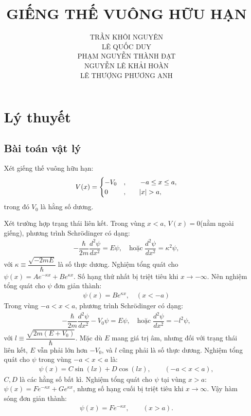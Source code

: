 \documentclass{article}
\title{\Huge{GIẾNG THẾ VUÔNG HỮU HẠN}}
\begin{document}
	\setlength{\parindent}{20pt}
	\newpage
	\author{TRẦN KHÔI NGUYÊN \\LÊ QUỐC DUY \\ PHẠM NGUYỄN THÀNH ĐẠT \\NGUYỄN LÊ KHẢI HOÀN \\ LÊ THƯỢNG PHƯƠNG ANH}
	\maketitle
	
	\newpage
	\tableofcontents
	\newpage
	\section{Lý thuyết}
	\subsection{Bài toán vật lý}
	Xét giếng thế vuông hữu hạn:
	\begin{align}
		V(x) = 
		\begin{cases}
			-V_0 &, \quad \quad -a  \leq x \leq a ,\\ 
			0    &, \quad \quad \abs{x} > a,
		\end{cases}
	\end{align}
	trong đó $V_0$ là hằng số dương.
	
	
	
	Xét trường hợp trạng thái liên kết. Trong vùng $x<a$, $V(x) = 0$(nằm ngoài giếng), phương trình Schr\"{o}dinger có dạng:
	\begin{align}
		-\dfrac{\hbar}{2m}\dfrac{d^2\psi}{dx^2} = E \psi, \quad \text{hoặc} \; \dfrac{d^2\psi}{dx^2} = \kappa^2 \psi,
	\end{align}
	với $\kappa \equiv \dfrac{\sqrt{-2mE}}{\hbar}$ là số thực dương. Nghiệm tổng quát cho $\psi(x) = A e^{-\kappa x} + B e^{\kappa x}$. Số hạng thứ nhất bị triệt tiêu khi $x \rightarrow -\infty$. Nên nghiệm tổng quát cho $\psi$ đơn giản thành:
	\begin{align}
		\psi(x) = B e^{\kappa x} , \quad(x< -a)
	\end{align}
	Trong vùng $-a < x < a$, phương trình Schr\"{o}dinger có dạng:
	\begin{align}
		-\dfrac{\hbar}{2m}\dfrac{d^2\psi}{dx^2} - V_0 \psi = E \psi, \quad \text{hoặc} \; \dfrac{d^2\psi}{dx^2} = -l^2 \psi,
	\end{align}
	với $l \equiv \dfrac{\sqrt{2m(E + V_0)}}{\hbar}$. Mặc dù $E$ mang giá trị âm, nhưng đối với trạng thái liên kết, $E$ vẫn phải lớn hơn $-V_0$, và $l$ cũng phải là số thực dương. Nghiệm tổng quát cho $\psi$ trong vùng $-a < x < a$ là:
	\begin{align}
		\psi(x) = C \sin (lx) + D \cos (lx) , \quad \quad ( -a < x < a),
	\end{align}
	$C,D$ là các hằng số bất kì. Nghiệm tổng quát cho $\psi$ tại vùng $x>a$: $\psi(x) = F e^{-\kappa x} + G e^{\kappa x}$, nhưng số hạng cuối bị triệt tiêu khi $x \rightarrow \infty$. Vậy hàm sóng đơn giản thành:
	\begin{align}
		\psi(x) = F e^{-\kappa x}, \quad \quad (x>a).
	\end{align}
	
\end{document}
